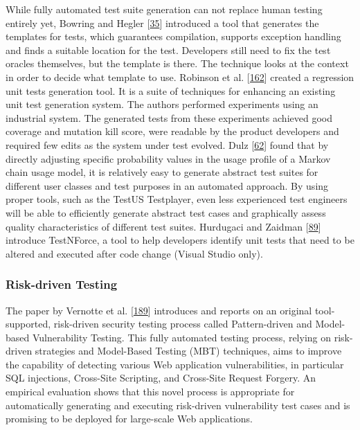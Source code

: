 \documentclass[]{book}
\begin{document}
While fully automated test suite generation can not replace human
testing entirely yet, Bowring and Hegler
{[}\protect\hyperlink{ref-bowring2014obsidian}{35}{]} introduced a tool
that generates the templates for tests, which guarantees compilation,
supports exception handling and finds a suitable location for the test.
Developers still need to fix the test oracles themselves, but the
template is there. The technique looks at the context in order to decide
what template to use. Robinson et al.
{[}\protect\hyperlink{ref-robinson2011}{162}{]} created a regression
unit tests generation tool. It is a suite of techniques for enhancing an
existing unit test generation system. The authors performed experiments
using an industrial system. The generated tests from these experiments
achieved good coverage and mutation kill score, were readable by the
product developers and required few edits as the system under test
evolved. Dulz {[}\protect\hyperlink{ref-dulz2013model}{62}{]} found that
by directly adjusting specific probability values in the usage profile
of a Markov chain usage model, it is relatively easy to generate
abstract test suites for different user classes and test purposes in an
automated approach. By using proper tools, such as the TestUS
Testplayer, even less experienced test engineers will be able to
efficiently generate abstract test cases and graphically assess quality
characteristics of different test suites. Hurdugaci and Zaidman
{[}\protect\hyperlink{ref-hurdugaci2012}{89}{]} introduce TestNForce, a
tool to help developers identify unit tests that need to be altered and
executed after code change (Visual Studio only).

\subsubsection{Risk-driven Testing}\label{risk-driven-testing}

The paper by Vernotte et al.
{[}\protect\hyperlink{ref-vernotte2015}{189}{]} introduces and reports
on an original tool-supported, risk-driven security testing process
called Pattern-driven and Model-based Vulnerability Testing. This fully
automated testing process, relying on risk-driven strategies and
Model-Based Testing (MBT) techniques, aims to improve the capability of
detecting various Web application vulnerabilities, in particular SQL
injections, Cross-Site Scripting, and Cross-Site Request Forgery. An
empirical evaluation shows that this novel process is appropriate for
automatically generating and executing risk-driven vulnerability test
cases and is promising to be deployed for large-scale Web applications.
\end{document}
